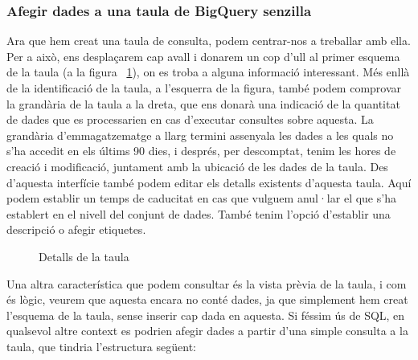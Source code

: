 \documentclass[12pt,longbibliography]{article}
\theoremstyle{definition}
\theoremstyle{remark}
\begin{document}
\subsubsection{Afegir dades a una taula de BigQuery senzilla}

Ara que hem creat una taula de consulta, podem centrar-nos a treballar amb ella. Per a això, ens desplaçarem cap avall i donarem un cop d'ull al primer esquema de la taula (a la figura ~\ref{fig:bq9}), on es troba a alguna informació interessant. Més enllà de la identificació de la taula, a l'esquerra de la figura, també podem comprovar la grandària de la taula a la dreta, que ens donarà una indicació de la quantitat de dades que es processarien en cas d'executar consultes sobre aquesta. La grandària d'emmagatzematge a llarg termini assenyala les dades a les quals no s'ha accedit en els últims 90 dies, i després, per descomptat, tenim les hores de creació i modificació, juntament amb la ubicació de les dades de la taula. Des d'aquesta interfície també podem editar els detalls existents d'aquesta taula. Aquí podem establir un temps de caducitat en cas que vulguem anul·lar el que s'ha establert en el nivell del conjunt de dades. També tenim l'opció d'establir una descripció o afegir etiquetes.


\begin{figure}[h!]
\par
{}%
\hfill
{}%
\par

\caption{Detalls de la taula}
\label{fig:bq9}
\end{figure}


Una altra característica que podem consultar és la vista prèvia de la taula, i com és lògic, veurem que aquesta encara no conté dades, ja que simplement hem creat l'esquema de la taula, sense inserir cap dada en aquesta. Si féssim ús de SQL, en qualsevol altre context es podrien afegir dades a partir d'una simple consulta a la taula, que tindria l'estructura següent:
\end{document}
